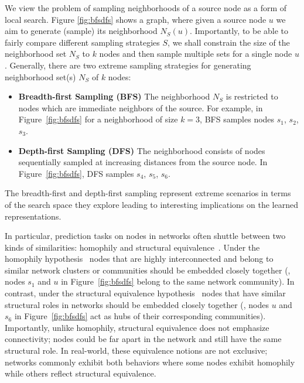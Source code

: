 We view the problem of sampling neighborhoods of a source node as a form of local search. Figure \ref{fig:bfsdfs} shows a graph, where given a source node $u$ we aim to generate (sample) its neighborhood $N_S(u)$. Importantly, to be able to fairly compare different sampling strategies $S$, we shall constrain the size of the neighborhood set $N_S$ to $k$ nodes and then sample multiple sets for a single node $u$. Generally, there are two extreme sampling strategies for generating neighborhood set(s) $N_S$ of $k$ nodes:
\begin{itemize}[noitemsep,nolistsep]
	\item \textbf {Breadth-first Sampling (BFS)} The neighborhood $N_S$ is restricted to nodes which are immediate neighbors of the source. For example, in Figure~\ref{fig:bfsdfs} for a neighborhood of size $k=3$, BFS samples nodes $s_1$, $s_2$, $s_{3}$.
	\item \textbf {Depth-first Sampling (DFS)} The neighborhood consists of nodes sequentially sampled at increasing distances from the source node. In Figure~\ref{fig:bfsdfs}, DFS samples $s_{4}$, $s_{5}$, $s_{6}$. 
\end{itemize}



The breadth-first and depth-first sampling represent extreme scenarios in terms of the search space they explore leading to interesting implications on the learned representations. 

In particular, prediction tasks on nodes in networks often shuttle between two kinds of similarities: homophily and structural equivalence~\cite{latentfactor}. Under the homophily hypothesis~\cite{fortunato09community, yang14ieee} nodes that are highly interconnected and belong to similar network clusters or communities should be embedded closely together (\eg, nodes $s_1$ and $u$ in Figure~\ref{fig:bfsdfs} belong to the same network community). In contrast, under the structural equivalence hypothesis~\cite{henderson-kdd2012} nodes that have similar structural roles in networks should be embedded closely together (\eg, nodes $u$ and $s_6$ in Figure~\ref{fig:bfsdfs} act as hubs of their corresponding communities). Importantly, unlike homophily, structural equivalence does not emphasize connectivity; nodes could be far apart in the network and still have the same structural role.
In real-world, these equivalence notions are not exclusive; networks commonly exhibit both behaviors where some nodes exhibit homophily while others reflect structural equivalence.

